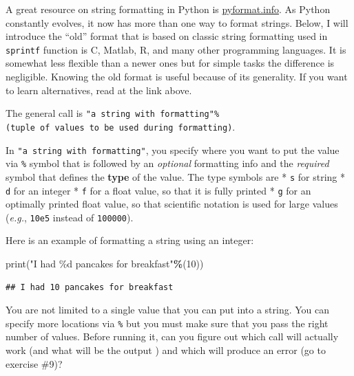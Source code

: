 \documentclass[
]{book}
\newenvironment{Shaded}{\begin{snugshade}}{\end{snugshade}}
\newcommand{\BuiltInTok}[1]{#1}
\newcommand{\DecValTok}[1]{\textcolor[rgb]{0.00,0.00,0.81}{#1}}
\newcommand{\NormalTok}[1]{#1}
\newcommand{\OperatorTok}[1]{\textcolor[rgb]{0.81,0.36,0.00}{\textbf{#1}}}
\newcommand{\SpecialCharTok}[1]{\textcolor[rgb]{0.00,0.00,0.00}{#1}}
\newcommand{\StringTok}[1]{\textcolor[rgb]{0.31,0.60,0.02}{#1}}
\begin{document}
A great resource on string formatting in Python is \href{https://pyformat.info/}{pyformat.info}. As Python constantly evolves, it now has more than one way to format strings. Below, I will introduce the ``old'' format that is based on classic string formatting used in \texttt{sprintf} function is C, Matlab, R, and many other programming languages. It is somewhat less flexible than a newer ones but for simple tasks the difference is negligible. Knowing the old format is useful because of its generality. If you want to learn alternatives, read at the link above.

The general call is \texttt{"a\ string\ with\ formatting"\%(tuple\ of\ values\ to\ be\ used\ during\ formatting)}.

In \texttt{"a\ string\ with\ formatting"}, you specify where you want to put the value via \texttt{\%} symbol that is followed by an \emph{optional} formatting info and the \emph{required} symbol that defines the \textbf{type} of the value. The type symbols are
* \texttt{s} for string
* \texttt{d} for an integer
* \texttt{f} for a float value, so that it is fully printed
* \texttt{g} for an optimally printed float value, so that scientific notation is used for large values (\emph{e.g.}, \texttt{10e5} instead of \texttt{100000}).

Here is an example of formatting a string using an integer:

\begin{Shaded}
\begin{Highlighting}[]
\BuiltInTok{print}\NormalTok{(}\StringTok{"I had }\SpecialCharTok{\%d}\StringTok{ pancakes for breakfast"}\OperatorTok{\%}\NormalTok{(}\DecValTok{10}\NormalTok{))}
\end{Highlighting}
\end{Shaded}

\begin{verbatim}
## I had 10 pancakes for breakfast
\end{verbatim}

You are not limited to a single value that you can put into a string. You can specify more locations via \texttt{\%} but you must make sure that you pass the right number of values. Before running it, can you figure out which call will actually work (and what will be the output ) and which will produce an error (go to exercise \#9)?
\end{document}
